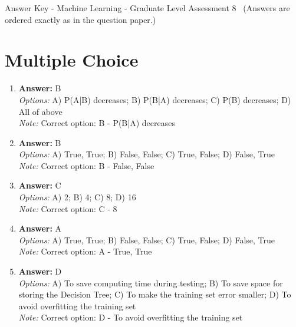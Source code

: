 \documentclass[12pt]{article}
\begin{document}
\begin{center}
Answer Key - Machine Learning - Graduate Level Assessment 8 \
\small (Answers are ordered exactly as in the question paper.)
\end{center}

\section*{Multiple Choice}
\begin{enumerate}[label=\arabic*.]
\item \textbf{Answer:} B
\\ \textit{Options:} A) P(A|B) decreases; B) P(B|A) decreases; C) P(B) decreases; D) All of above
\\ \textit{Note:} Correct option: B - P(B|A) decreases
\item \textbf{Answer:} B
\\ \textit{Options:} A) True, True; B) False, False; C) True, False; D) False, True
\\ \textit{Note:} Correct option: B - False, False
\item \textbf{Answer:} C
\\ \textit{Options:} A) 2; B) 4; C) 8; D) 16
\\ \textit{Note:} Correct option: C - 8
\item \textbf{Answer:} A
\\ \textit{Options:} A) True, True; B) False, False; C) True, False; D) False, True
\\ \textit{Note:} Correct option: A - True, True
\item \textbf{Answer:} D
\\ \textit{Options:} A) To save computing time during testing; B) To save space for storing the Decision Tree; C) To make the training set error smaller; D) To avoid overfitting the training set
\\ \textit{Note:} Correct option: D - To avoid overfitting the training set
\end{enumerate}
\end{document}
